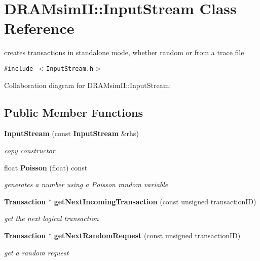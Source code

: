 \section{DRAMsimII::InputStream Class Reference}
\label{class_d_r_a_msim_i_i_1_1_input_stream}
creates transactions in standalone mode, whether random or from a trace file  


{\tt \#include $<$InputStream.h$>$}

Collaboration diagram for DRAMsimII::InputStream:\subsection*{Public Member Functions}
\begin{CompactItemize}
\item 
{\bf InputStream} (const {\bf InputStream} \&rhs)\label{class_d_r_a_msim_i_i_1_1_input_stream_b7a2341cd4a7baa33c292700db305469}

\begin{CompactList}\small\item\em copy constructor \item\end{CompactList}\item 
float {\bf Poisson} (float) const 
\begin{CompactList}\small\item\em generates a number using a Poisson random variable \item\end{CompactList}\item 
{\bf Transaction} $\ast$ {\bf getNextIncomingTransaction} (const unsigned transactionID)
\begin{CompactList}\small\item\em get the next logical transaction \item\end{CompactList}\item 
{\bf Transaction} $\ast$ {\bf getNextRandomRequest} (const unsigned transactionID)
\begin{CompactList}\small\item\em get a random request \item\end{CompactList}\end{CompactItemize}

